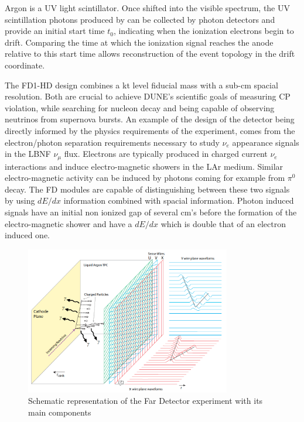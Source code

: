 Argon is a UV light scintillator. Once shifted into the visible spectrum, the UV scintillation photons produced by can be collected by photon detectors and provide an initial start time $t_0$, indicating when the ionization electrons begin to drift. Comparing the time at which the ionization signal reaches the anode relative to this start time allows reconstruction of the event topology in the drift coordinate. 

The FD1-HD design combines a kt level fiducial mass with a sub-cm spacial resolution. Both are crucial to achieve DUNE's scientific goals of measuring CP violation, while searching for nucleon decay and being capable of observing neutrinos from supernova bursts. An example of the design of the detector being directly informed by the physics requirements of the experiment, comes from the electron/photon separation requirements necessary to study $\nu_e$ appearance signals in the LBNF $\nu_\mu$ flux. Electrons are typically produced in charged current $\nu_e$ interactions and induce electro-magnetic showers in the LAr medium. Similar electro-magnetic activity can be induced by photons coming for example from $\pi^0$ decay. The FD modules are capable of distinguishing between these two signals by using $dE/dx$ information combined with spacial information. Photon induced signals have an initial non ionized gap of several cm's before the formation of the electro-magnetic shower and have a $dE/dx$ which is double that of an electron induced one.

\begin{figure}[!t]
     \centering
     \includegraphics[width=0.8\textwidth]{figures/ch3-DUNE/TheBoPicture.png}
     \caption{Schematic representation of the Far Detector experiment with its main components}
        \label{fig:DUNEdiagram}
\end{figure}

